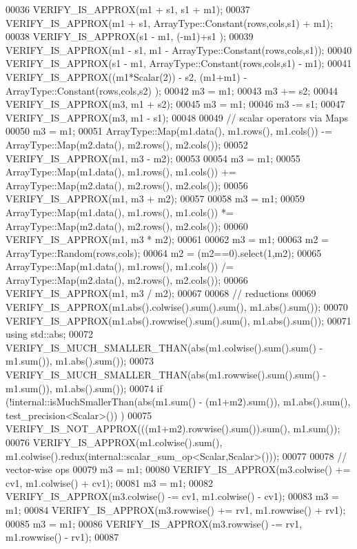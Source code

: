 \begin{DoxyCode}
00036   VERIFY\_IS\_APPROX(m1 + s1, s1 + m1);
00037   VERIFY\_IS\_APPROX(m1 + s1, ArrayType::Constant(rows,cols,s1) + m1);
00038   VERIFY\_IS\_APPROX(s1 - m1, (-m1)+s1 );
00039   VERIFY\_IS\_APPROX(m1 - s1, m1 - ArrayType::Constant(rows,cols,s1));
00040   VERIFY\_IS\_APPROX(s1 - m1, ArrayType::Constant(rows,cols,s1) - m1);
00041   VERIFY\_IS\_APPROX((m1*Scalar(2)) - s2, (m1+m1) - ArrayType::Constant(rows,cols,s2) );
00042   m3 = m1;
00043   m3 += s2;
00044   VERIFY\_IS\_APPROX(m3, m1 + s2);
00045   m3 = m1;
00046   m3 -= s1;
00047   VERIFY\_IS\_APPROX(m3, m1 - s1);  
00048   
00049   \textcolor{comment}{// scalar operators via Maps}
00050   m3 = m1;
00051   ArrayType::Map(m1.data(), m1.rows(), m1.cols()) -= ArrayType::Map(m2.data(), m2.rows(), m2.cols());
00052   VERIFY\_IS\_APPROX(m1, m3 - m2);
00053   
00054   m3 = m1;
00055   ArrayType::Map(m1.data(), m1.rows(), m1.cols()) += ArrayType::Map(m2.data(), m2.rows(), m2.cols());
00056   VERIFY\_IS\_APPROX(m1, m3 + m2);
00057   
00058   m3 = m1;
00059   ArrayType::Map(m1.data(), m1.rows(), m1.cols()) *= ArrayType::Map(m2.data(), m2.rows(), m2.cols());
00060   VERIFY\_IS\_APPROX(m1, m3 * m2);
00061   
00062   m3 = m1;
00063   m2 = ArrayType::Random(rows,cols);
00064   m2 = (m2==0).select(1,m2);
00065   ArrayType::Map(m1.data(), m1.rows(), m1.cols()) /= ArrayType::Map(m2.data(), m2.rows(), m2.cols());  
00066   VERIFY\_IS\_APPROX(m1, m3 / m2);
00067 
00068   \textcolor{comment}{// reductions}
00069   VERIFY\_IS\_APPROX(m1.abs().colwise().sum().sum(), m1.abs().sum());
00070   VERIFY\_IS\_APPROX(m1.abs().rowwise().sum().sum(), m1.abs().sum());
00071   \textcolor{keyword}{using} std::abs;
00072   VERIFY\_IS\_MUCH\_SMALLER\_THAN(abs(m1.colwise().sum().sum() - m1.sum()), m1.abs().sum());
00073   VERIFY\_IS\_MUCH\_SMALLER\_THAN(abs(m1.rowwise().sum().sum() - m1.sum()), m1.abs().sum());
00074   \textcolor{keywordflow}{if} (!internal::isMuchSmallerThan(abs(m1.sum() - (m1+m2).sum()), m1.abs().sum(), test\_precision<Scalar>())
      )
00075       VERIFY\_IS\_NOT\_APPROX(((m1+m2).rowwise().sum()).sum(), m1.sum());
00076   VERIFY\_IS\_APPROX(m1.colwise().sum(), m1.colwise().redux(internal::scalar\_sum\_op<Scalar,Scalar>()));
00077 
00078   \textcolor{comment}{// vector-wise ops}
00079   m3 = m1;
00080   VERIFY\_IS\_APPROX(m3.colwise() += cv1, m1.colwise() + cv1);
00081   m3 = m1;
00082   VERIFY\_IS\_APPROX(m3.colwise() -= cv1, m1.colwise() - cv1);
00083   m3 = m1;
00084   VERIFY\_IS\_APPROX(m3.rowwise() += rv1, m1.rowwise() + rv1);
00085   m3 = m1;
00086   VERIFY\_IS\_APPROX(m3.rowwise() -= rv1, m1.rowwise() - rv1);
00087   

\end{DoxyCode}
